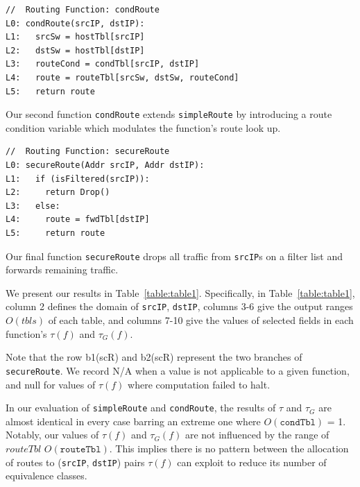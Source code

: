 {\small
\begin{verbatim}
//  Routing Function: condRoute
L0: condRoute(srcIP, dstIP):
L1:   srcSw = hostTbl[srcIP]
L2:   dstSw = hostTbl[dstIP]
L3:   routeCond = condTbl[srcIP, dstIP]
L4:   route = routeTbl[srcSw, dstSw, routeCond]
L5:   return route
\end{verbatim}
}
Our second function \texttt{condRoute} extends \texttt{simpleRoute} by introducing a route condition variable which modulates the function's route look up.


{\small
\begin{verbatim}
//  Routing Function: secureRoute
L0: secureRoute(Addr srcIP, Addr dstIP):
L1:   if (isFiltered(srcIP)):
L2:     return Drop()
L3:   else:
L4:     route = fwdTbl[dstIP]
L5:     return route
\end{verbatim}
}
Our final function \texttt{secureRoute} drops all traffic from \texttt{srcIP}s on a filter list and forwards remaining traffic.

 We present our results in Table~\ref{table:table1}. Specifically, in Table~\ref{table:table1}, column 2 defines the domain of \texttt{srcIP}, \texttt{dstIP}, columns 3-6 give the output ranges $O(tbls)$ of each table, and columns 7-10 give the values of selected fields in each function's $\tau(f)$ and $\tau_G(f)$. 

Note that the row b1(scR) and b2(scR) represent the two branches of \texttt{secureRoute}. We record N/A when a value is not applicable to a given function, and null for values of $\tau(f)$ where computation failed to halt.


In our evaluation of \texttt{simpleRoute} and \texttt{condRoute}, the results of $\tau$ and $\tau_G$ are almost identical in every case barring an extreme one where $O(\texttt{condTbl})$ = 1. Notably, our values of $\tau(f)$ and $\tau_G(f)$ are not influenced by the range of $routeTbl$ $O(\texttt{routeTbl})$. This implies there is no pattern between the allocation of routes to (\texttt{srcIP}, \texttt{dstIP}) pairs $\tau(f)$ can exploit to reduce its number of equivalence classes.

